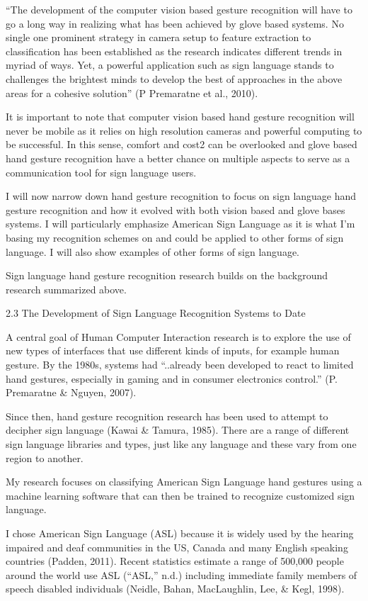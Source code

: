 ``The development of the computer vision based gesture recognition will have to go a long way in realizing what has been achieved by glove based systems. No single one prominent strategy in camera setup to feature extraction to classification has been established as the research indicates different trends in myriad of ways. Yet, a powerful application such as sign language stands to challenges the brightest minds to develop the best of approaches in the above areas for a cohesive solution'' (P Premaratne et al., 2010). 

It is important to note that computer vision based hand gesture recognition will never be mobile as it relies on high resolution cameras and powerful computing to be successful. In this sense, comfort and cost2 can be overlooked and glove based hand gesture recognition have a better chance on multiple aspects to serve as a communication tool for sign language users. 

I will now narrow down hand gesture recognition to focus on sign language hand gesture recognition and how it evolved with both vision based and glove bases systems. I will particularly emphasize American Sign Language as it is what I’m basing my recognition schemes on and could be applied to other forms of sign language. I will also show examples of other forms of sign language. 

Sign language hand gesture recognition research builds on the background research summarized above. 


2.3 The Development of Sign Language Recognition Systems to Date

A central goal of Human Computer Interaction research is to explore the use of new types of interfaces that use different kinds of inputs, for example human gesture. By the 1980s, systems had ``..already been developed to react to limited hand gestures, especially in gaming and in consumer electronics control.'' (P. Premaratne \& Nguyen, 2007).

Since then, hand gesture recognition research has been used to attempt to decipher sign language (Kawai \& Tamura, 1985). There are a range of different sign language libraries and types, just like any language and these vary from one region to another.

My research focuses on classifying American Sign Language hand gestures using a machine learning software that can then be trained to recognize customized sign language. 

I chose American Sign Language (ASL) because it is widely used by the hearing impaired and deaf communities in the US, Canada and many English speaking countries (Padden, 2011). Recent statistics estimate a range of 500,000 people around the world use ASL (``ASL,'' n.d.) including immediate family members of speech disabled individuals (Neidle, Bahan, MacLaughlin, Lee, \& Kegl, 1998).


